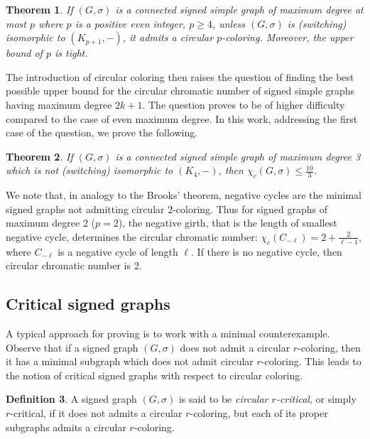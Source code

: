\documentclass[11pt,a4paper]{article}
\newtheorem{theorem}{Theorem}
\theoremstyle{definition}
\newtheorem{definition}[theorem]{Definition}
\begin{document}
	\begin{theorem}\label{thm:BrooksDelat=2k}
		If $(G, \sigma)$ is a connected signed simple graph of maximum degree at most $p$ where $p$ is a positive even integer, $p\geq 4$, unless $(G, \sigma)$ is (switching) isomorphic to $(K_{p+1}, -)$, it admits a circular $p$-coloring. Moreover, the upper bound of $p$ is tight. 
	\end{theorem}
	
	The introduction of circular coloring then raises the question of finding the best possible upper bound for the circular chromatic number of signed simple graphs having maximum degree $2k+1$. The question proves to be of higher difficulty compared to the case of even maximum degree. In this work, addressing the first case of the question, we prove the following.
	
	\begin{theorem}\label{thm:BrooksDelat=3}
		If $(G, \sigma)$ is a connected signed simple graph of maximum degree 3 which is not (switching) isomorphic to $(K_4,-)$, then $\chi_c(G, \sigma) \leq \frac{10}{3}$.
	\end{theorem}
	
	We note that, in analogy to the Brooks' theorem, negative cycles are the minimal signed graphs not admitting circular 2-coloring. Thus for signed graphs of maximum degree 2 ($p=2$), the negative girth, that is the length of smallest negative cycle, determines the circular chromatic number: $\chi_{c}(C_{-\ell})=2+\frac{2}{\ell-1}$, where $C_{-\ell}$ is a negative cycle of length $\ell$. If there is no negative cycle, then circular chromatic number is 2.
	
	\subsection{Critical signed graphs}
	
	A typical approach for proving  is to work with a minimal counterexample. Observe that if a signed graph $(G, \sigma)$ does not admit a circular $r$-coloring, then it has a minimal subgraph which does not admit circular $r$-coloring. This leads to the notion of critical signed graphs with respect to circular coloring.
	
	\begin{definition}
		A signed graph $(G, \sigma)$ is said to be \emph{circular $r$-critical}, or simply $r$-critical, if it does not admits a circular $r$-coloring, but each of  its proper subgraphs admits a circular $r$-coloring.
	\end{definition}
	
\end{document}

